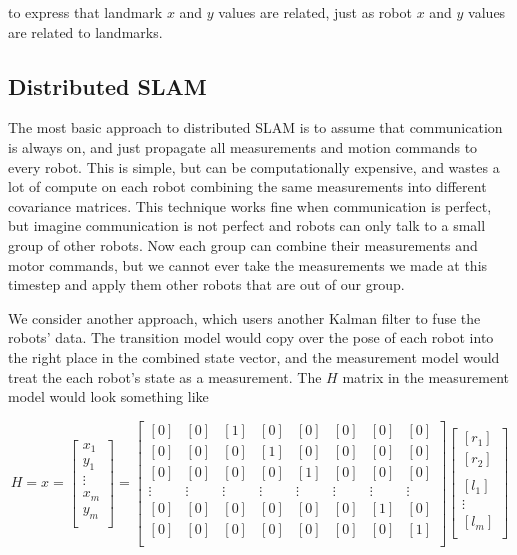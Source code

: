 \documentclass[prodmode,acmtecs]{acmsmall} %
\begin{document}
to express that landmark $x$ and $y$ values are related, just as robot $x$ and $y$ values are related to landmarks.

\subsection{Distributed SLAM}

The most basic approach to distributed SLAM is to assume that communication is always on, and just propagate all measurements and motion commands to every robot. This is simple, but can be computationally expensive, and wastes a lot of compute on each robot combining the same measurements into different covariance matrices. This technique works fine when communication is perfect, but imagine communication is not perfect and robots can only talk to a small group of other robots. Now each group can combine their measurements and motor commands, but we cannot ever take the measurements we made at this timestep and apply them other robots that are out of our group.

We consider another approach, which users another Kalman filter to fuse the robots' data. The transition model would copy over the pose of each robot into the right place in the combined state vector, and the measurement model would treat the each robot's state as a measurement. The $H$ matrix in the measurement model would look something like

$$
H
=
x 
= 
\begin{bmatrix}
    x_1    \\
    y_1    \\
    \vdots \\
    x_m    \\
    y_m    \\
\end{bmatrix}
=
\begin{bmatrix}
    [ 0 ]  & [ 0 ]  & [ 1 ] & [ 0 ] & [ 0 ]  & [ 0 ]  & [ 0 ]  & [ 0 ] \\
    [ 0 ]  & [ 0 ]  & [ 0 ] & [ 1 ] & [ 0 ]  & [ 0 ]  & [ 0 ]  & [ 0 ] \\
    [ 0 ]  & [ 0 ]  & [ 0 ] & [ 0 ] & [ 1 ]  & [ 0 ]  & [ 0 ]  & [ 0 ] \\
    \vdots & \vdots & \vdots & \vdots & \vdots & \vdots & \vdots & \vdots \\
    [ 0 ]  & [ 0 ]  & [ 0 ] & [ 0 ] & [ 0 ]  & [ 0 ]  & [ 1 ]  & [ 0 ] \\
    [ 0 ]  & [ 0 ]  & [ 0 ] & [ 0 ] & [ 0 ]  & [ 0 ]  & [ 0 ]  & [ 1 ] \\
\end{bmatrix}                 
\begin{bmatrix}
    [ r_1 ] \\
    [ r_2 ] \\
    \\
    [ l_1 ] \\
    \vdots \\
    [ l_m ] \\
\end{bmatrix}
$$
\end{document}
